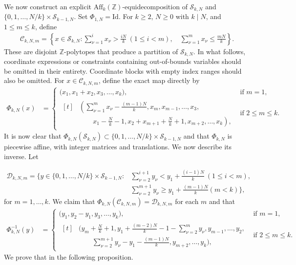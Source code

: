 \documentclass[a4paper,reqno,12pt]{amsart}
\theoremstyle{plain}
\theoremstyle{plain}
\theoremstyle{remark}
\theoremstyle{plain}
\newcommand{\C}{\mathscr{C}}
\newcommand{\D}{\mathscr{D}}
\newcommand{\cS}{\mathscr{S}}
\newcommand{\aff}{\text{Aff}}
\newcommand{\Z}{\mathbb{Z}}
\theoremstyle{plain}
\theoremstyle{plain}
\begin{document}
{We now construct  an explicit $\aff_k(\Z)$-equidecomposition of $\cS_{k,N}$ and $\{0,1,\ldots,N/k\} \times \cS_{k-1,N}$.
Set $\Phi_{1,N} = \text{Id}$.  For $k\geq2${, $N\geq0$ with $k\mid N$,} and ${1\leq m\leq k}$, define
\begin{align}
\C_{k,N,m}=\left\{x\in{\cS_{k,N}}:
 \sum_{\nu=1}^{i}x_\nu>\frac{iN}{k}\ (1\leq i<m),
 \quad
 \sum_{\nu=1}^{m}x_\nu\leq\frac{mN}{k}\right\}.
\label{eq:sourcePieces}
\end{align}
These are disjoint $\Z$-polytopes {that produce a partition of}
${\cS_{k,N}}$. {In what follows, coordinate expressions or constraints containing {out-of-bounds} variables should be omitted in their entirety. Coordinate blocks with empty index ranges should also be omitted.} For $x\in\C_{k,N,m}$, define the exact map directly by
\begin{align}
\Phi_{k,N}(x)
&=
\begin{cases}
\big(x_1,x_1+x_2,x_3,\ldots,x_k\big),
& \text{if }m=1,\\[1mm]
\begin{aligned}[t]
&\left(\displaystyle\sum_{\nu=1}^{m}x_\nu
-\frac{(m-1)N}{k},
x_m,x_{m-1},\ldots,x_3,\right.\\[-1mm]
&\quad \quad \left.x_1-\frac Nk-1,
x_2+x_{m+1}+\frac Nk+1,x_{m+2},\ldots,x_k\right),
\end{aligned}
& \text{if }2\leq m \leq k.
\end{cases}
\label{eq:fold}
\end{align}
It is now clear that $\Phi_{k,N}(\cS_{k,N}) \subset \{0,1,\ldots,N/k\} \times \cS_{k-1,N}$ and that $\Phi_{k,N}$ is piecewise affine, with integer matrices and translations. We now describe its inverse. Let
{
\begin{align}
\D_{k,N,m}=\bigg\{y\in\{0,1,\ldots,N/k\}\times\cS_{k-1,N}:{}&
 \sum_{\nu=2}^{i+1}y_\nu<y_1+\frac{(i-1)N}{k}\ (1\leq i<m),
 \nonumber\\[-1mm]
&\sum_{\nu=2}^{m+1}y_\nu\geq y_1+\frac{(m-1)N}{k}  (m<k) \bigg\},
\label{eq:targetPieces}
\end{align}
for $m=1,\ldots,k$. We claim that $\Phi_{k,N}({\C_{k,N,m}}) = \D_{k,N,m}$ for each $m$ and that
\begin{align}
\Phi_{k,N}^{-1}(y)
&=
\begin{cases}
\big(y_1,y_2-y_1,y_3,\ldots,y_k\big),
& \text{if }m=1,\\[1mm]
\begin{aligned}[t]
&\Big(
y_m+\frac Nk+1,
y_1+\frac{(m-2)N}{k}-1-\sum_{\nu=2}^{m}y_\nu,
y_{m-1},\ldots,y_2,\\
& \quad \quad \sum_{\nu=2}^{m+1}y_\nu-y_1-\frac{(m-1)N}{k},
y_{m+2},\ldots,y_k\Big),
\end{aligned}
& \text{if }2\leq m \leq k.
\end{cases}
\label{eq:foldInverse}
\end{align}
We prove that in the following proposition.


}}
\end{document}
